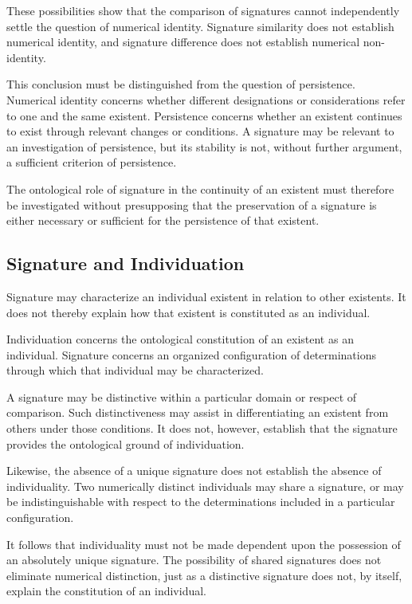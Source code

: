 These possibilities show that the comparison of
signatures cannot independently settle the question
of numerical identity. Signature similarity does
not establish numerical identity, and signature
difference does not establish numerical non-identity.

This conclusion must be distinguished from the
question of persistence. Numerical identity concerns
whether different designations or considerations
refer to one and the same existent. Persistence
concerns whether an existent continues to exist
through relevant changes or conditions. A signature
may be relevant to an investigation of persistence,
but its stability is not, without further argument,
a sufficient criterion of persistence.

The ontological role of signature in the continuity
of an existent must therefore be investigated
without presupposing that the preservation of a
signature is either necessary or sufficient for
the persistence of that existent.

\subsection{Signature and Individuation}

Signature may characterize an individual existent
in relation to other existents. It does not thereby
explain how that existent is constituted as an
individual.

Individuation concerns the ontological constitution
of an existent as an individual. Signature concerns
an organized configuration of determinations through
which that individual may be characterized.

A signature may be distinctive within a particular
domain or respect of comparison. Such distinctiveness
may assist in differentiating an existent from
others under those conditions. It does not,
however, establish that the signature provides
the ontological ground of individuation.

Likewise, the absence of a unique signature does
not establish the absence of individuality. Two
numerically distinct individuals may share a
signature, or may be indistinguishable with respect
to the determinations included in a particular
configuration.

It follows that individuality must not be made
dependent upon the possession of an absolutely
unique signature. The possibility of shared
signatures does not eliminate numerical distinction,
just as a distinctive signature does not, by itself,
explain the constitution of an individual.

